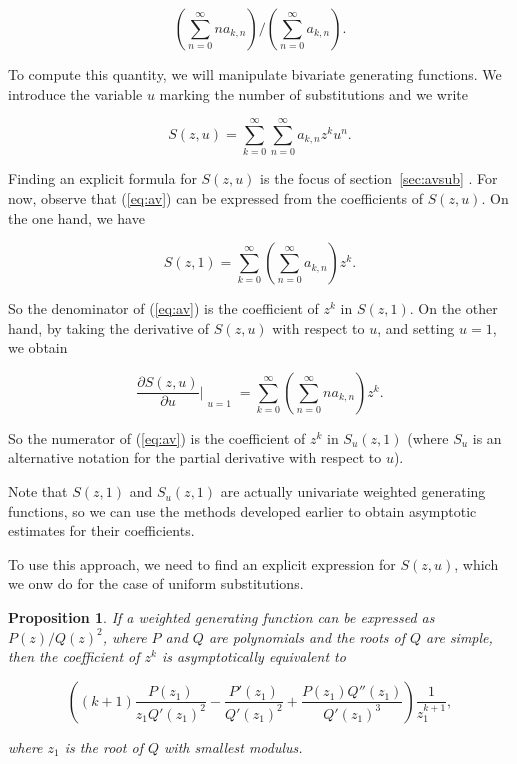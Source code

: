 \documentclass{article}
\newtheorem{proposition}{Proposition}
\begin{document}
\begin{equation}
\label{eq:av}
\left( \sum_{n=0}^\infty na_{k,n} \right) \Big/
 \left( \sum_{n=0}^\infty a_{k,n} \right).
\end{equation}

To compute this quantity, we will manipulate bivariate generating
functions. We introduce the variable $u$ marking the number of
substitutions and we write

\begin{equation*}
S(z,u) = \sum_{k=0}^\infty\sum_{n=0}^\infty a_{k,n}z^ku^n.
\end{equation*}

Finding an explicit formula for $S(z,u)$ is the focus of
section~\ref{sec:avsub} .  For now, observe that (\ref{eq:av}) can be
expressed from the coefficients of $S(z,u)$. On the one hand, we have

\begin{equation*}
S(z,1) = \sum_{k=0}^\infty \left( \sum_{n=0}^\infty a_{k,n} \right) z^k.
\end{equation*}

So the denominator of (\ref{eq:av}) is the coefficient of $z^k$ in
$S(z,1)$. On the other hand, by taking the derivative of $S(z,u)$ with
respect to $u$, and setting $u=1$, we obtain

\begin{equation*}
\frac{\partial S(z,u)}{\partial u} \Bigr|_{\substack{\\u=1}} =
\sum_{k=0}^\infty \left( \sum_{n=0}^\infty na_{k,n} \right) z^k.
\end{equation*}

So the numerator of (\ref{eq:av}) is the coefficient of $z^k$ in
$S_u(z,1)$ (where $S_u$ is an alternative notation for the partial
derivative with respect to $u$).

Note that $S(z,1)$ and $S_u(z,1)$ are
actually univariate weighted generating functions, so we can use the
methods developed earlier to obtain asymptotic estimates for their
coefficients.

To use this approach, we need to find an explicit expression for $S(z,u)$,
which we onw do for the case of uniform substitutions.





\begin{proposition}
\label{th:ass2}
If a weighted generating function can be expressed as $P(z)/Q(z)^2$, where
$P$ and $Q$ are polynomials and the roots of $Q$ are simple, then the
coefficient of $z^k$ is asymptotically equivalent to

\begin{equation}
\label{eq:ass2}
\left( (k+1)\frac{P(z_1)}{z_1 Q'(z_1)^2} - \frac{P'(z_1)}{Q'(z_1)^2} +
\frac{P(z_1)Q''(z_1)}{Q'(z_1)^3} \right)
\frac{1}{z_1^{k+1}},
\end{equation}

\noindent
where $z_1$ is the root of $Q$ with smallest \textit{modulus}.
\end{proposition}
\end{document}
